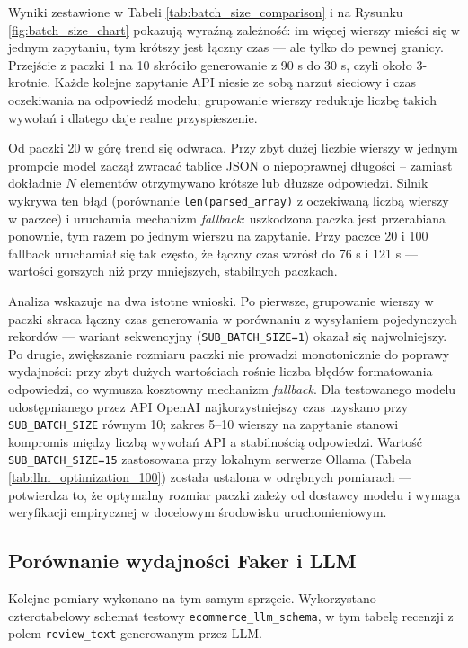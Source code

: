 Wyniki zestawione w Tabeli \ref{tab:batch_size_comparison} i na Rysunku \ref{fig:batch_size_chart} pokazują wyraźną zależność: im więcej wierszy mieści się w jednym zapytaniu, tym krótszy jest łączny czas --- ale tylko do pewnej granicy. Przejście z paczki 1 na 10 skróciło generowanie z 90 s do 30 s, czyli około 3-krotnie. Każde kolejne zapytanie API niesie ze sobą narzut sieciowy i czas oczekiwania na odpowiedź modelu; grupowanie wierszy redukuje liczbę takich wywołań i dlatego daje realne przyspieszenie.

Od paczki 20 w górę trend się odwraca. Przy zbyt dużej liczbie wierszy w jednym prompcie model zaczął zwracać tablice \gls{JSON} o niepoprawnej długości -- zamiast dokładnie $N$ elementów otrzymywano krótsze lub dłuższe odpowiedzi. Silnik wykrywa ten błąd (porównanie \texttt{len(parsed\_array)} z oczekiwaną liczbą wierszy w paczce) i uruchamia mechanizm \textit{fallback}: uszkodzona paczka jest przerabiana ponownie, tym razem po jednym wierszu na zapytanie. Przy paczce 20 i 100 fallback uruchamiał się tak często, że łączny czas wzrósł do 76 s i 121 s --- wartości gorszych niż przy mniejszych, stabilnych paczkach.

Analiza wskazuje na dwa istotne wnioski. Po pierwsze, grupowanie wierszy w paczki skraca łączny czas generowania w porównaniu z wysyłaniem pojedynczych rekordów --- wariant sekwencyjny (\texttt{SUB\_BATCH\_SIZE=1}) okazał się najwolniejszy. Po drugie, zwiększanie rozmiaru paczki nie prowadzi monotonicznie do poprawy wydajności: przy zbyt dużych wartościach rośnie liczba błędów formatowania odpowiedzi, co wymusza kosztowny mechanizm \textit{fallback}. Dla testowanego modelu udostępnianego przez API OpenAI najkorzystniejszy czas uzyskano przy \texttt{SUB\_BATCH\_SIZE} równym 10; zakres 5--10 wierszy na zapytanie stanowi kompromis między liczbą wywołań API a stabilnością odpowiedzi. Wartość \texttt{SUB\_BATCH\_SIZE=15} zastosowana przy lokalnym serwerze Ollama (Tabela \ref{tab:llm_optimization_100}) została ustalona w odrębnych pomiarach --- potwierdza to, że optymalny rozmiar paczki zależy od dostawcy modelu i wymaga weryfikacji empirycznej w docelowym środowisku uruchomieniowym.

\subsection*{Porównanie wydajności Faker i LLM}
Kolejne pomiary wykonano na tym samym sprzęcie. Wykorzystano czterotabelowy schemat testowy \texttt{ecommerce\_llm\_\allowbreak schema}, w tym tabelę recenzji z polem \texttt{review\_text} generowanym przez \gls{LLM}.

